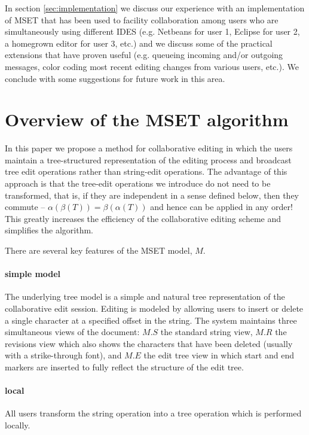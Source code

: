 \documentclass{amsart}
\begin{document}
In section \ref{sec:implementation} we discuss our experience with an implementation of MSET that has been used to facility collaboration among users who are simultaneously using different IDES (e.g. Netbeans for user 1, Eclipse for user 2, a homegrown editor for user 3, etc.) and we discuss some of the practical extensions that have proven useful (e.g. queueing incoming and/or outgoing messages, color coding most recent editing changes from various users, etc.). We conclude with some suggestions for future work in this area.

\section{Overview of the MSET algorithm}
\label{sec:overview}

In this paper we propose a method for collaborative editing in which the
users maintain a tree-structured representation of the editing process and
broadcast tree edit operations rather than string-edit operations. The advantage
of this approach is that the tree-edit operations we introduce do not need to be transformed, that is, if they are independent in a sense defined below, then they commute -- $\alpha(\beta(T)) = \beta(\alpha(T))$ and hence can be applied in any order! This greatly increases
the efficiency of the collaborative editing scheme and simplifies the algorithm.


There are several key features of the MSET model, $M$.

\paragraph{\bf simple model}
The underlying tree model is a simple and natural tree representation
of the collaborative edit session. Editing is modeled by allowing users to insert or delete a single character at a specified offset in the string. The system maintains three simultaneous views of the document: $M.S$ the standard string view, $M.R$ the revisions view which also shows the characters that have been deleted (usually with a strike-through font), and $M.E$ the edit tree view in which start and end markers are inserted to fully reflect the structure of the edit tree.

\paragraph{\bf local}
All users transform the string operation into a tree operation
which is performed locally.
\end{document}
